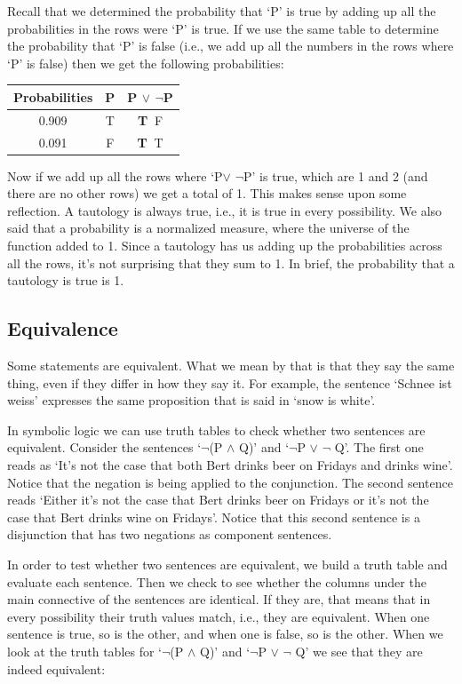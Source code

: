 \documentclass[]{tufte-book}
\begin{document}
Recall that we determined the probability that `P' is true by adding up all the probabilities in the rows were `P' is true. If we use the same table to determine the probability that `P' is false (i.e., we add up all the numbers in the rows where `P' is false) then we get the following probabilities:

\begin{longtable}[]{@{}ccc@{}}
\toprule
Probabilities & P & P \(\vee\) \(\neg\)P\tabularnewline
\midrule
\endhead
0.909 & T & \textbf{T\(~\)} F\tabularnewline
0.091 & F & \textbf{T\(~\)} T\tabularnewline
\bottomrule
\end{longtable}

Now if we add up all the rows where `P\(\vee\) \(\neg\)P' is true, which are 1 and 2 (and there are no other rows) we get a total of 1. This makes sense upon some reflection. A tautology is always true, i.e., it is true in every possibility. We also said that a probability is a normalized measure, where the universe of the function added to 1. Since a tautology has us adding up the probabilities across all the rows, it's not surprising that they sum to 1. In brief, the probability that a tautology is true is 1.

\hypertarget{equivalence}{%
\subsection{Equivalence}\label{equivalence}}

Some statements are equivalent. What we mean by that is that they say the same thing, even if they differ in how they say it. For example, the sentence `Schnee ist weiss' expresses the same proposition that is said in `snow is white'.

In symbolic logic we can use truth tables to check whether two sentences are equivalent. Consider the sentences `\(\neg\)(P \(\wedge\) Q)' and `\(\neg\)P \(\vee\) \(\neg\) Q'. The first one reads as `It's not the case that both Bert drinks beer on Fridays and drinks wine'. Notice that the negation is being applied to the conjunction. The second sentence reads `Either it's not the case that Bert drinks beer on Fridays or it's not the case that Bert drinks wine on Fridays'. Notice that this second sentence is a disjunction that has two negations as component sentences.

In order to test whether two sentences are equivalent, we build a truth table and evaluate each sentence. Then we check to see whether the columns under the main connective of the sentences are identical. If they are, that means that in every possibility their truth values match, i.e., they are equivalent. When one sentence is true, so is the other, and when one is false, so is the other. When we look at the truth tables for `\(\neg\)(P \(\wedge\) Q)' and `\(\neg\)P \(\vee\) \(\neg\) Q' we see that they are indeed equivalent:
\end{document}
